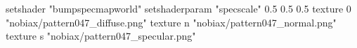 setshader "bumpspecmapworld"
setshaderparam "specscale" 0.5 0.5 0.5
    texture 0 "nobiax/pattern047_diffuse.png"
    texture n "nobiax/pattern047_normal.png"
    texture s "nobiax/pattern047_specular.png"